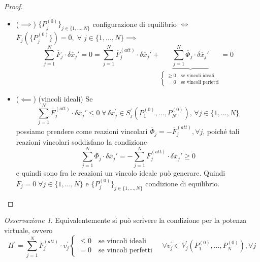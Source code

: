 \documentclass{book}
\theoremstyle{plain}
\theoremstyle{plain}
\theoremstyle{plain}
\theoremstyle{plain}
\theoremstyle{plain}
\theoremstyle{definition}
\theoremstyle{remark}
\newtheorem*{oss}{Osservazione}
\theoremstyle{definition}
\begin{document}
\begin{proof}

    \noindent 
    \begin{itemize}
        \item ($\implies$) $\{P_j^{(0)}\}_{j \in\{1, \ldots, N\}}$ configurazione di equilibrio $\iff$ $\overline{F}_j(\{P_j^{(0)}\})=\overline{0}, \;\forall \; j \in \{1, \ldots, N\} \implies$ 
        \begin{displaymath}
            \sum_{j=1}^N\overline{F}_j\cdot\delta\overline{x}_j'=0=\sum_{j=1}^N\overline{F}_j^{(att)}\cdot\delta\overline{x}_j'+\underbrace{\sum_{j=1}^N\overline{\Phi}_j\cdot\delta\overline{x}_j'}_{\begin{cases}
            \geq 0 \quad \text{se vincoli ideali} \\
            = 0 \quad \text{se vincoli perfetti}
        \end{cases}}=0
        \end{displaymath}
        \item ($\impliedby$) (vincoli ideali) Se
        \begin{displaymath}
            \sum_{j=1}^N\overline{F}_j^{(att)}\cdot\delta\overline{x}_j'\leq 0 \;\forall \,\delta \overline{x}_{j}^{\prime} \in S_{j}^{\prime}(P_1^{(0)},\ldots,P_N^{(0)}), \,\forall j \in \{1, \ldots, N\}
        \end{displaymath} possiamo prendere come reazioni vincolari $\overline{\Phi}_j=-\overline{F}_j^{(att)}, \forall j$, poiché tali reazioni vincolari soddisfano la condizione
        \begin{displaymath}
            \sum_{j=1}^N\overline{\Phi}_j\cdot\delta\overline{x}_j'=-\sum_{j=1}^N\overline{F}_j^{(att)}\cdot\delta\overline{x}_j'\geq 0
        \end{displaymath}
        e quindi sono fra le reazioni un vincolo ideale può generare. Quindi $\overline{F}_j=\overline{0}\;\forall j \in \{1, \ldots, N\}$ e $\{P_j^{(0)}\}_{j \in\{1, \ldots, N\}}$ condizione di equilibrio.
    \end{itemize}
\end{proof}

\begin{oss}
    Equivalentemente si può scrivere la condizione per la potenza virtuale, ovvero
    \begin{displaymath}
        \Pi^{\prime}=\sum_{j=1}^{N} \overline{F}_{j}^{(att)} \cdot \overline{v}_{j}^{\prime}
        \begin{cases}
            \leq 0 \quad \text{se vincoli ideali} \\
            = 0 \quad \text{se vincoli perfetti}
        \end{cases}
        \quad \forall \overline{v}_{j}^{\prime} \in V_{j}^{\prime}\left(P_1^{(0)},\ldots,P_N^{(0)}\right), \forall j
    \end{displaymath}
\end{oss}
\end{document}
